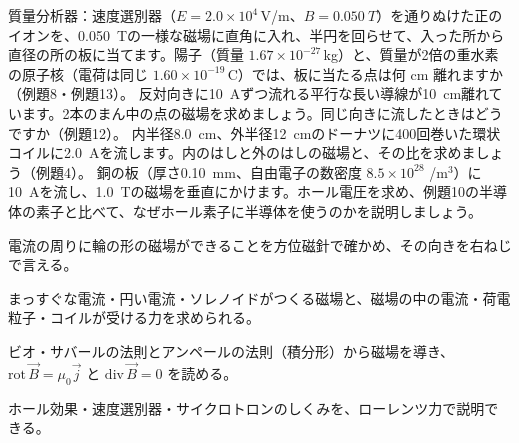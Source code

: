 \bkproblem 質量分析器：速度選別器（$E=2.0\times10^4$\,V/m、$B=\qty{0.050}{T}$）を通りぬけた正のイオンを、\qty{0.050}{T}の一様な磁場に直角に入れ、半円を回らせて、入った所から直径の所の板に当てます。陽子（質量 $1.67\times10^{-27}$\,kg）と、質量が2倍の重水素の原子核（電荷は同じ $1.60\times10^{-19}$\,C）では、板に当たる点は何 cm 離れますか（例題8・例題13）。
\bkproblem 反対向きに\qty{10}{A}ずつ流れる平行な長い導線が\qty{10}{cm}離れています。2本のまん中の点の磁場を求めましょう。同じ向きに流したときはどうですか（例題12）。
\bkproblem 内半径\qty{8.0}{cm}、外半径\qty{12}{cm}のドーナツに400回巻いた環状コイルに\qty{2.0}{A}を流します。内のはしと外のはしの磁場と、その比を求めましょう（例題4）。
\bkproblem 銅の板（厚さ\qty{0.10}{mm}、自由電子の数密度 $8.5\times10^{28}$ /m$^3$）に\qty{10}{A}を流し、\qty{1.0}{T}の磁場を垂直にかけます。ホール電圧を求め、例題10の半導体の素子と比べて、なぜホール素子に半導体を使うのかを説明しましょう。

\begin{furikaeri}
\begin{checklist}
\item 電流の周りに輪の形の磁場ができることを方位磁針で確かめ、その向きを右ねじで言える。
\item まっすぐな電流・円い電流・ソレノイドがつくる磁場と、磁場の中の電流・荷電粒子・コイルが受ける力を求められる。
\item ビオ・サバールの法則とアンペールの法則（積分形）から磁場を導き、$\mathrm{rot}\,\vec B=\mu_0\vec j$ と $\mathrm{div}\,\vec B=0$ を読める。
\item ホール効果・速度選別器・サイクロトロンのしくみを、ローレンツ力で説明できる。
\end{checklist}
\end{furikaeri}
